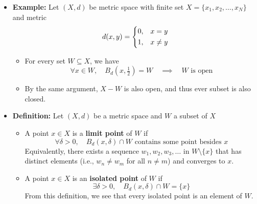 \documentclass[11pt,twoside]{report}
\begin{document}
\begin{itemize}
\item \textbf{Example:} Let $(X,d)$ be metric space with finite set $X = \{ x_1, x_2, \dots , x_N\}$ and metric
\[
d(x,y) = \begin{dcases} 0, & x  = y\\
1, & x \ne y 
\end{dcases}
\]
\begin{itemize}
\item For every set $W \subseteq X$, we have 
\[
\forall x \in W, \quad B_d(x,\tfrac{1}{2}) = W \quad \implies \quad \text{$W$ is open} 
\]
\item By the same argument, $X  - W$ is also open, and thus ever subset is also closed. 
\end{itemize}



\item \textbf{Definition:} Let $(X, d)$ be a metric space and $W$ a subset of $X$
\begin{itemize}
\item A point $x\in X$ is a \textbf{limit point} of $W$ if
\[
 \forall \delta > 0, \quad B_d(x, \delta) \cap W \text{ contains some point besides $x$}
\]
Equivalently, there exists a sequence $w_1, w_2, w_3 , \dots$ in $W \setminus \{x\}$ that has distinct elements (i.e., $w_n \ne w_m$ for all $n \ne m$) and converges to $x$. 

\item A point $x\in X$ is an \textbf{isolated point} of $W$ if %
\[
\exists \delta > 0, \quad B_d(x, \delta) \cap W = \{ x\}
\]
From this definition, %
we see that every isolated point is an element of $W$. 


\end{itemize}





\end{itemize}
\end{document}
